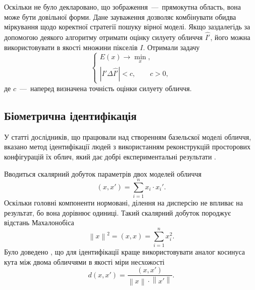 Оскільки не було декларовано, що зображення~---~прямокутна область,
вона може бути довільної форми.
Дане зауваження дозволяє комбінувати обидва міркування
щодо коректної стратегії пошуку вірної моделі.
Якщо заздалегідь за допомогою деякого алгоритму отримати
оцінку силуету обличчя $\hat{I'}$,
його можна використовувати в якості множини пікселів $I$.
Отримали задачу
\begin{equation*}
  \begin{cases}
    E\left( x \right) \to \min\limits_x, \\
    \left| I' \Delta \hat{I'} \right| < c, \qquad c > 0,
  \end{cases}
\end{equation*}
де $c$~---~наперед визначена точність оцінки силуету обличчя.

\subsection{Біометрична ідентифікація}

У статті дослідників, що працювали над створенням базельскої моделі обличчя,
вказано метод ідентифікації людей з використанням реконструкцій
просторових конфігурацій їх облич,
який дає добрі експериментальні результати \cite{blanz:romdhani:vetter}.

Вводиться скалярний добуток параметрів двох моделей обличчя
\begin{equation*}
  \left( x, x' \right) = \sum_{i=1}^n x_i \cdot x_i'.
\end{equation*}
Оскільки головні компоненти нормовані,
ділення на дисперсію не впливає на результат,
бо вона дорівнює одиниці.
Такий скалярний добуток породжує відстань Махалонобіса \cite{Haykin:1998}
\begin{equation*}
  \left\| x \right\|^2 = \left( x, x \right) = \sum_{i=1}^n x_i^2.
\end{equation*}
Було доведено \cite{Moon:2017},
що для ідентифікації краще використовувати аналог косинуса кута
між двома обличчями в якості міри несхожості
\begin{equation*}
  d\left( x, x' \right)
  = \frac{\left( x, x' \right)}{\left\| x \right\| \cdot \left\| x' \right\|}.
\end{equation*}
